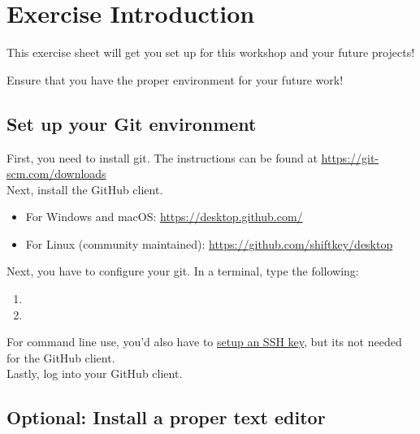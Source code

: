 \documentclass[paper=a4]{scrartcl}
\newcommand{\theexercisenumber}{1} %
\newcommand{\thedate}{27.09.2023} %
\begin{document}
\date{\thedate}
\exercise{\theexercisenumber}

\parskip 8pt
\makesheetheader

\section*{Exercise Introduction}
This exercise sheet will get you set up for this workshop and your future projects!

\tableofcontents

\bigskip


Ensure that you have the proper environment for your future work!

\subsection*{Set up your Git environment}

First, you need to install git. The instructions can be found at \href{https://git-scm.com/downloads}{\url{https://git-scm.com/downloads}}\\

Next, install the GitHub client.
\begin{itemize}
  \item For Windows and macOS: \href{https://desktop.github.com/}{\url{https://desktop.github.com/}}
  \item For Linux (community maintained): \href{https://github.com/shiftkey/desktop}{\url{https://github.com/shiftkey/desktop}}
\end{itemize}

Next, you have to configure your git. In a terminal, type the following:
\begin{enumerate}
	\item {}
  \item {}
\end{enumerate}

For command line use, you'd also have to \href{https://docs.github.com/en/authentication/connecting-to-github-with-ssh}{setup an SSH key}, but its not needed for the GitHub client.\\

Lastly, log into your GitHub client.

\subsection*{Optional: Install a proper text editor}
\end{document}
